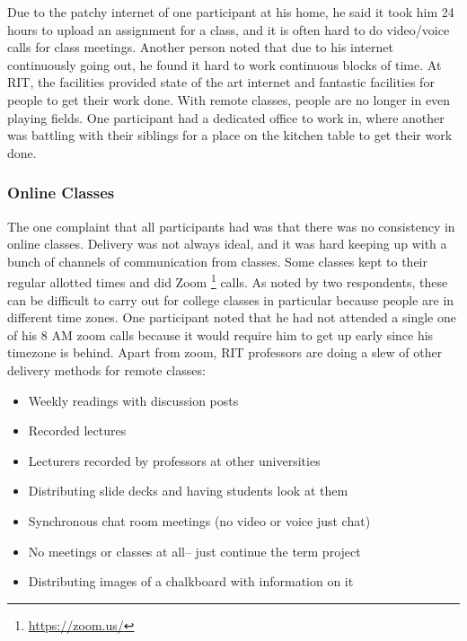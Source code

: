 \documentclass[12pt,
 reprint,
nofootinbib,
 amsmath,amssymb,
 aps,
floatfix,
]{revtex4-2}
\begin{document}
Due to the patchy internet of one participant at his home, he said it took him 24 hours to upload an assignment for a class, and it is often hard to do video/voice calls for class meetings. Another person noted that due to his internet continuously going out, he found it hard to work continuous blocks of time. At RIT, the facilities provided state of the art internet and fantastic facilities for people to get their work done. With remote classes, people are no longer in even playing fields. One participant had a dedicated office to work in, where another was battling with their siblings for a place on the kitchen table to get their work done. 





\subsubsection{Online Classes}


The one complaint that all participants had was that there was no consistency in online classes. Delivery was not always ideal, and it was hard keeping up with a bunch of channels of communication from classes. Some classes kept to their regular allotted times and did Zoom \footnote{\url{https://zoom.us/}} calls. As noted by two respondents, these can be difficult to carry out for college classes in particular because people are in different time zones. One participant noted that he had not attended a single one of his 8 AM zoom calls because it would require him to get up early since his timezone is behind. Apart from zoom, RIT professors are doing a slew of other delivery methods for remote classes:

\begin{itemize}
    \item Weekly readings with discussion posts
    \item Recorded lectures
    \item Lecturers recorded by professors at other universities
    \item Distributing slide decks and having students look at them
    \item Synchronous chat room meetings (no video or voice just chat)
    \item No meetings or classes at all-- just continue the term project
    \item Distributing images of a chalkboard with information on it
\end{itemize}
\end{document}

